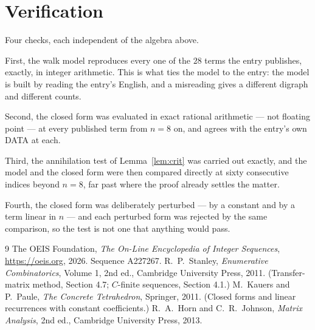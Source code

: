 \documentclass[11pt,a4paper]{article}
\theoremstyle{plain}
\theoremstyle{definition}
\begin{document}
\section{Verification}

Four checks, each independent of the algebra above.

First, the walk model reproduces every one of the $28$ terms the entry publishes,
exactly, in integer arithmetic. This is what ties the model to the entry: the model is built
by reading the entry's English, and a misreading gives a different digraph and different
counts.

Second, the closed form was evaluated in exact rational arithmetic --- not floating point ---
at every published term from $n=8$ on, and agrees with the entry's own DATA at each.

Third, the annihilation test of Lemma~\ref{lem:crit} was carried out exactly, and the model
and the closed form were then compared directly at sixty consecutive indices beyond
$n=8$, far past where the proof already settles the matter.

Fourth, the closed form was deliberately perturbed --- by a constant and by a term linear in
$n$ --- and each perturbed form was rejected by the same comparison, so the test is not one
that anything would pass.

\begin{thebibliography}{9}
 The OEIS Foundation, \emph{The On-Line Encyclopedia of Integer
Sequences}, \url{https://oeis.org}, 2026. Sequence A227267.
 R.~P.~Stanley, \emph{Enumerative Combinatorics}, Volume 1, 2nd ed.,
Cambridge University Press, 2011. (Transfer-matrix method, Section 4.7; $C$-finite sequences,
Section 4.1.)
 M.~Kauers and P.~Paule, \emph{The Concrete Tetrahedron}, Springer, 2011.
(Closed forms and linear recurrences with constant coefficients.)
 R.~A.~Horn and C.~R.~Johnson, \emph{Matrix Analysis}, 2nd ed., Cambridge
University Press, 2013.
\end{thebibliography}
\end{document}
